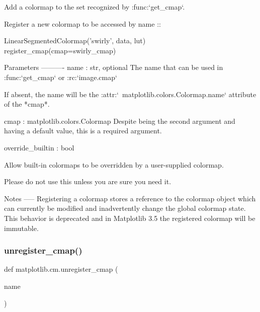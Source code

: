 \begin{DoxyVerb}Add a colormap to the set recognized by :func:`get_cmap`.

Register a new colormap to be accessed by name ::

    LinearSegmentedColormap('swirly', data, lut)
    register_cmap(cmap=swirly_cmap)

Parameters
----------
name : str, optional
   The name that can be used in :func:`get_cmap` or :rc:`image.cmap`

   If absent, the name will be the :attr:`~matplotlib.colors.Colormap.name`
   attribute of the *cmap*.

cmap : matplotlib.colors.Colormap
   Despite being the second argument and having a default value, this
   is a required argument.

override_builtin : bool

    Allow built-in colormaps to be overridden by a user-supplied
    colormap.

    Please do not use this unless you are sure you need it.

Notes
-----
Registering a colormap stores a reference to the colormap object
which can currently be modified and inadvertently change the global
colormap state. This behavior is deprecated and in Matplotlib 3.5
the registered colormap will be immutable.\end{DoxyVerb}
 \mbox{\label{namespacematplotlib_1_1cm_a03c39fa84f05a5d6f8f35fbe5ee48e3c}} 
\subsubsection{\texorpdfstring{unregister\+\_\+cmap()}{unregister\_cmap()}}
{\footnotesize\ttfamily def matplotlib.\+cm.\+unregister\+\_\+cmap (\begin{DoxyParamCaption}\item[{}]{name }\end{DoxyParamCaption})}


